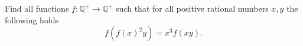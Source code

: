 Find all functions $f\colon\mathbb{Q}^+ \rightarrow \mathbb{Q}^+$ such that for
all positive rational numbers $x,y$ the following holds
$$f(f(x)^2y) = x^3f(xy).$$
